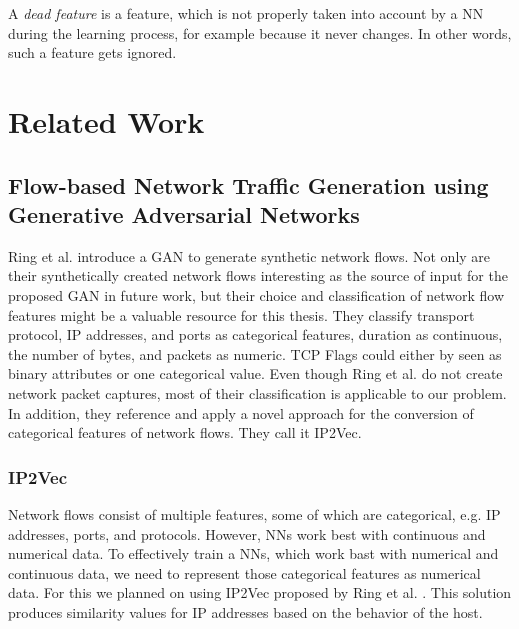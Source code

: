 \documentclass[
	ngerman,
	ruledheaders=section,%
	class=report,%
	thesis={type=bachelor},%
	accentcolor=9c,%
	custommargins=true,%
	marginpar=false,%
	parskip=half-,%
	fontsize=11pt,%
]{tudapub}
\begin{document}
A \textit{dead feature} is a feature, which is not properly taken into account by a NN during the learning process, for example because it never changes. In other words, such a feature gets ignored.

\chapter{Related Work}
\label{sec:relatedWork}


\section{Flow-based Network Traffic Generation using Generative Adversarial Networks}
\label{sec:ringGAN}

Ring et al. \cite{ringFlowbasedNetworkTraffic2019a} introduce a GAN to generate synthetic network flows.
Not only are their synthetically created network flows interesting as the source of input for the proposed GAN in future work,
but their choice and classification of network flow features might be a valuable resource for this thesis.
They classify transport protocol, IP addresses, and ports as categorical features, duration as continuous, the number of bytes, and packets as numeric.
TCP Flags could either by seen as binary attributes or one categorical value.
Even though Ring et al. \cite{ringFlowbasedNetworkTraffic2019a} do not create network packet captures, most of their classification is applicable to our problem.
In addition, they reference and apply a novel approach for the conversion of categorical features of network flows.
They call it IP2Vec.

\subsection{IP2Vec}
\label{sec:IP2Vec}

Network flows consist of multiple features, some of which are categorical, e.g. IP addresses, ports, and protocols.
However, NNs work best with continuous and numerical data.
To effectively train a NNs, which work bast with numerical and continuous data, we need to represent those categorical features as numerical data.
For this we planned on using IP2Vec proposed by Ring et al. \cite{ringIP2VecLearningSimilarities2017}.
This solution produces similarity values for IP addresses based on the behavior of the host.
\end{document}

